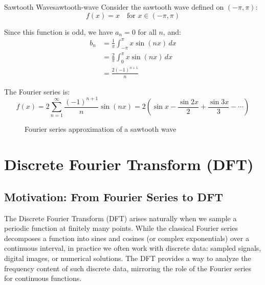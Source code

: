 \begin{example}{Sawtooth Wave}{sawtooth-wave}
    Consider the sawtooth wave defined on \((-\pi, \pi)\):
    \begin{equation}
        f(x) = x \quad \text{for } x \in (-\pi, \pi)
    \end{equation}

    Since this function is odd, we have \(a_n = 0\) for all \(n\), and:
    \begin{align}
        b_n & = \frac{1}{\pi} \int_{-\pi}^{\pi} x \sin(nx) \, dx \\
            & = \frac{2}{\pi} \int_{0}^{\pi} x \sin(nx) \, dx    \\
            & = \frac{2(-1)^{n+1}}{n}
    \end{align}

    The Fourier series is:
    \begin{equation}
        f(x) = 2 \sum_{n=1}^{\infty} \frac{(-1)^{n+1}}{n} \sin(nx) = 2\left(\sin x - \frac{\sin 2x}{2} + \frac{\sin 3x}{3} - \cdots\right)
    \end{equation}
\end{example}

\begin{figure}[H]
    \centering
    
    \caption{Fourier series approximation of a sawtooth wave}
    \label{fig:fourier-sawtooth}
\end{figure}

\section{Discrete Fourier Transform (DFT)}

\subsection{Motivation: From Fourier Series to DFT}
The Discrete Fourier Transform (DFT) arises naturally when we sample a periodic function at finitely many points. While the classical Fourier series decomposes a function into sines and cosines (or complex exponentials) over a continuous interval, in practice we often work with discrete data: sampled signals, digital images, or numerical solutions. The DFT provides a way to analyze the frequency content of such discrete data, mirroring the role of the Fourier series for continuous functions.

